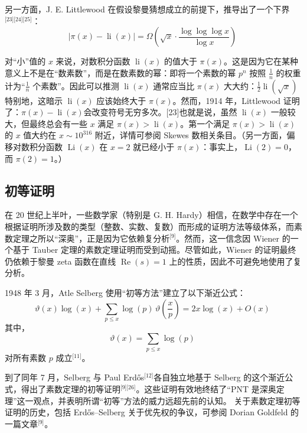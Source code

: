 另一方面，J. E. Littlewood 在假设黎曼猜想成立的前提下，推导出了一个下界\(^\text{[23][24][25]}\)：
$$
\left| \pi(x) - \operatorname{li}(x) \right| = \Omega\left( \sqrt{x} \cdot \frac{\log \log \log x}{\log x} \right)~
$$

对“小”值的 $x$ 来说，对数积分函数 $\operatorname{li}(x)$ 的值大于 $\pi(x)$。这是因为它在某种意义上不是在“数素数”，而是在数素数的幂：即将一个素数的幂 $p^n$ 按照 $\frac{1}{n}$ 的权重计为“$\frac{1}{n}$ 个素数”。因此可以推测 $\operatorname{li}(x)$ 通常应当比 $\pi(x)$ 大大约：$\frac{1}{2} \operatorname{li}(\sqrt{x})$特别地，这暗示 $\operatorname{li}(x)$ 应该始终大于 $\pi(x)$。然而，1914 年，Littlewood 证明了：$\pi(x) - \operatorname{li}(x)$会改变符号无穷多次。[23]也就是说，虽然 $\operatorname{li}(x)$ 一般较大，但最终总会有一些 $x$ 满足 $\pi(x) > \operatorname{li}(x)$。第一个满足 $\pi(x) > \operatorname{li}(x)$ 的 $x$ 值大约在 $x \sim 10^{316}$ 附近，详情可参阅 Skewes 数相关条目。（另一方面，偏移对数积分函数 $\operatorname{Li}(x)$ 在 $x = 2$ 就已经小于 $\pi(x)$：事实上，$\operatorname{Li}(2) = 0$，而 $\pi(2) = 1$。）
\subsection{初等证明}
在 20 世纪上半叶，一些数学家（特别是 G. H. Hardy）相信，在数学中存在一个根据证明所涉及数的类型（整数、实数、复数）而形成的证明方法等级体系，而素数定理之所以“深奥”，正是因为它依赖复分析\(^\text{[9]}\)。然而，这一信念因 Wiener 的一个基于 Tauber 定理的素数定理证明而受到动摇。尽管如此，Wiener 的证明最终仍依赖于黎曼 zeta 函数在直线 $\operatorname{Re}(s) = 1$ 上的性质，因此不可避免地使用了复分析。

1948 年 3 月，Atle Selberg 使用“初等方法”建立了以下渐近公式：
$$
\vartheta(x)\log(x) + \sum_{p \leq x} \log(p) \, \vartheta\left(\frac{x}{p}\right) = 2x\log(x) + O(x)~
$$
其中，
$$
\vartheta(x) = \sum_{p \leq x} \log(p)~
$$
对所有素数 $p$ 成立\(^\text{[11]}\)。

到了同年 7 月，Selberg 与 Paul Erdős\(^\text{[12]}\)各自独立地基于 Selberg 的这个渐近公式，得出了素数定理的初等证明\(^\text{[9][26]}\)。这些证明有效地终结了“PNT 是深奥定理”这一观点，并表明所谓“初等”方法的威力远超先前的认知。
关于素数定理初等证明的历史，包括 Erdős–Selberg 关于优先权的争议，可参阅 Dorian Goldfeld 的一篇文章\(^\text{[9]}\)。

